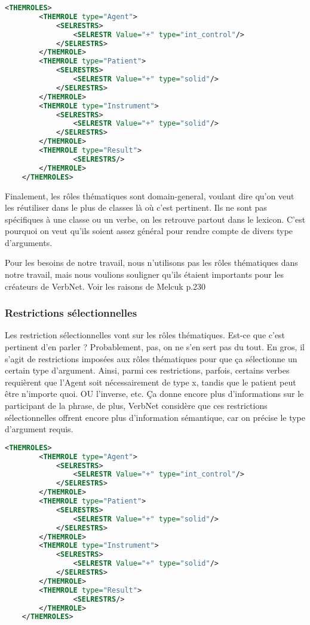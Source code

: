 \begin{lstlisting}[language=XML, caption = les rôles thématiques]
    <THEMROLES>
        <THEMROLE type="Agent">
            <SELRESTRS>
                <SELRESTR Value="+" type="int_control"/>
            </SELRESTRS>
        </THEMROLE>
        <THEMROLE type="Patient">
            <SELRESTRS>
                <SELRESTR Value="+" type="solid"/>
            </SELRESTRS>
        </THEMROLE>
        <THEMROLE type="Instrument">
            <SELRESTRS>
                <SELRESTR Value="+" type="solid"/>
            </SELRESTRS>
        </THEMROLE>
        <THEMROLE type="Result">
                <SELRESTRS/>
        </THEMROLE>
    </THEMROLES>
\end{lstlisting}
Finalement, les rôles thématiques sont domain-general, voulant dire qu'on veut les réutiliser dans le plus de classes là où c'est pertinent. Ils ne sont pas spécifiques à une classe ou un verbe, on les retrouve partout dans le lexicon. C'est pourquoi on veut qu'ils soient assez général pour rendre compte de divers type d'arguments.

Pour les besoins de notre travail, nous n'utilisons pas les rôles thématiques dans notre travail, mais nous voulions souligner qu'ils étaient importants pour les créateurs de VerbNet. 
Voir les raisons de Melcuk p.230

\subsubsection{Restrictions sélectionnelles}

Les restriction sélectionnelles vont sur les rôles thématiques. Est-ce que c'est pertinent d'en parler ? Probablement, pas, on ne s'en sert pas du tout.
En gros, il s'agit de restrictions imposées aux rôles thématiques pour que ça sélectionne un certain type d'argument. Ainsi, parmi ces restrictions, parfois, certains verbes requièrent que l'Agent soit nécessairement de type x, tandis que le patient peut être n'importe quoi. OU l'inverse, etc.
Ça donne encore plus d'informations sur le participant de la phrase, de plus, VerbNet considère que ces restrictions sélectionnelles offrent encore plus d'information sémantique, car on précise le type d'argument requis.
\begin{lstlisting}[language=Xml, caption = les restrictions sélectionnelles]
    <THEMROLES>
        <THEMROLE type="Agent">
            <SELRESTRS>
                <SELRESTR Value="+" type="int_control"/>
            </SELRESTRS>
        </THEMROLE>
        <THEMROLE type="Patient">
            <SELRESTRS>
                <SELRESTR Value="+" type="solid"/>
            </SELRESTRS>
        </THEMROLE>
        <THEMROLE type="Instrument">
            <SELRESTRS>
                <SELRESTR Value="+" type="solid"/>
            </SELRESTRS>
        </THEMROLE>
        <THEMROLE type="Result">
                <SELRESTRS/>
        </THEMROLE>
    </THEMROLES>
\end{lstlisting}

